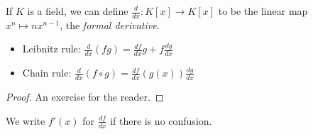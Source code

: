 \documentclass[a4paper, 10pt, twocolumn]{amsart}
\begin{document}
If $K$ is a field, we can define $\frac{d}{dx}:K[x] \rightarrow K[x]$ to be the linear map $x^n \mapsto nx^{n-1}$, the \emph{formal derivative}.

\begin{proposition}
\item
\begin{itemize}
\item{Leibnitz rule}: $\frac{d}{dx}(fg) = \frac{df}{dx}g + f\frac{dg}{dx}$
\item{Chain rule}: $\frac{d}{dx}(f\circ g) = \frac{df}{dx}(g(x))\frac{dg}{dx}$
\end{itemize}
\end{proposition}
\begin{proof}
An exercise for the reader.
\end{proof}
We write $f'(x)$ for $\frac{df}{dx}$ if there is no confusion.
\end{document}
